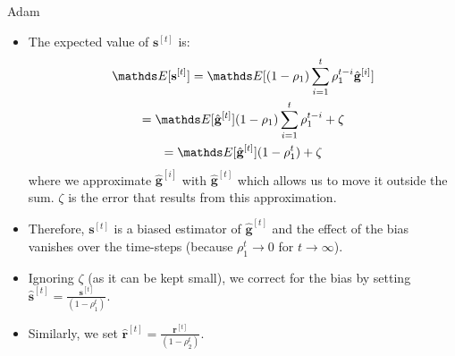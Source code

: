\documentclass[11pt,compress,t,notes=noshow, xcolor=table]{beamer}
\begin{document}
\begin{vbframe}{Adam}
	
	\begin{itemize}
		\item The expected value  of $\mathbf{s}^{[t]}$ is:
		\footnotesize
		\begin{gather*}
		\E [\mathbf{s}^{[t]}] = \E [ (1 - \rho_1) \sum_{i=1}^t \rho_1^{t - i} \hat{\mathbf{g}}^{[i]}] \\
		= \E [\hat{\mathbf{g}}^{[t]}] (1 - \rho_1) \sum_{i=1}^t \rho_1^{t - i} + \zeta\\
		= \E [\hat{\mathbf{g}}^{[t]}] (1 - \rho_1^{t}) + \zeta
		\end{gather*}
		\normalsize
		where we approximate $\hat{\mathbf{g}}^{[i]}$ with $\hat{\mathbf{g}}^{[t]}$ which allows us to move it outside the sum. $\zeta$ is the error that results from this approximation.
		\item Therefore, $\mathbf{s}^{[t]}$ is a biased estimator of $\hat{\mathbf{g}}^{[t]}$ and the effect of the bias vanishes over the time-steps (because $\rho_1^t \rightarrow 0$ for $t \rightarrow \infty$).
		\item Ignoring $\zeta$ (as it can be kept small), we correct for the bias by setting $\hat{\mathbf{s}}^{[t]} = \frac{\mathbf{s}^{[t]}}{(1 - \rho_1^{t})}$.
		\item Similarly, we set $\hat{\mathbf{r}}^{[t]} = \frac{\mathbf{r}^{[t]}}{(1 - \rho_2^{t})}$.
	\end{itemize}
\end{vbframe}

\end{document}
